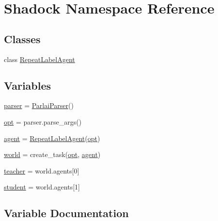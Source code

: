 \hypertarget{namespaceShadock}{}\section{Shadock Namespace Reference}
\label{namespaceShadock}
\subsection*{Classes}
\begin{DoxyCompactItemize}
\item 
class \hyperlink{classShadock_1_1RepeatLabelAgent}{Repeat\+Label\+Agent}
\end{DoxyCompactItemize}
\subsection*{Variables}
\begin{DoxyCompactItemize}
\item 
\hyperlink{namespaceShadock_ac8bec66fd11468b8d014b78e0f076168}{parser} = \hyperlink{classparlai_1_1core_1_1params_1_1ParlaiParser}{Parlai\+Parser}()
\item 
\hyperlink{namespaceShadock_ac5de26058c2175bfdfb877050f0b208e}{opt} = parser.\+parse\+\_\+args()
\item 
\hyperlink{namespaceShadock_a3455790d1c4915428cdddf6b9e46a58c}{agent} = \hyperlink{classShadock_1_1RepeatLabelAgent}{Repeat\+Label\+Agent}(\hyperlink{namespaceShadock_ac5de26058c2175bfdfb877050f0b208e}{opt})
\item 
\hyperlink{namespaceShadock_ac842a79eeebd6d6a7de512f53c36b056}{world} = create\+\_\+task(\hyperlink{namespaceShadock_ac5de26058c2175bfdfb877050f0b208e}{opt}, \hyperlink{namespaceShadock_a3455790d1c4915428cdddf6b9e46a58c}{agent})
\item 
\hyperlink{namespaceShadock_a21eede1a81cd93d5171e2c5989796836}{teacher} = world.\+agents\mbox{[}0\mbox{]}
\item 
\hyperlink{namespaceShadock_ab2d7d84abaa3abe19a6117bae9ac9712}{student} = world.\+agents\mbox{[}1\mbox{]}
\end{DoxyCompactItemize}


\subsection{Variable Documentation}
\mbox{\label{namespaceShadock_a3455790d1c4915428cdddf6b9e46a58c}} 
